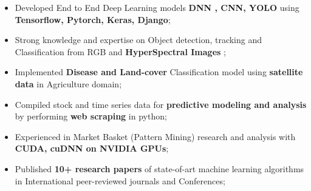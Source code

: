 \documentclass[10pt,a4paper]{altacv}
\begin{document}


%

\begin{fullwidth}
\makecvheader
\end{fullwidth}

%





\begin{itemize}
  \item Developed End to End Deep Learning models \textbf{DNN , CNN, YOLO } using \textbf{Tensorflow, Pytorch, Keras, Django};
  \item Strong knowledge and expertise on Object detection, tracking and Classification from RGB and \textbf{HyperSpectral Images} ;
	\item Implemented \textbf{Disease and Land-cover} Classification model using \textbf{satellite data} in Agriculture domain;
 	\item Compiled stock and time series data for \textbf{predictive modeling and analysis} by performing \textbf{web scraping} in python;
  \item Experienced in Market Basket (Pattern Mining)  research and analysis with \textbf{CUDA, cuDNN on NVIDIA GPUs};
  \item Published \textbf{10+ research papers} of state-of-art machine learning algorithms in International peer-reviewed journals and Conferences; 

\end{itemize}

\divider
%

\end{document}
